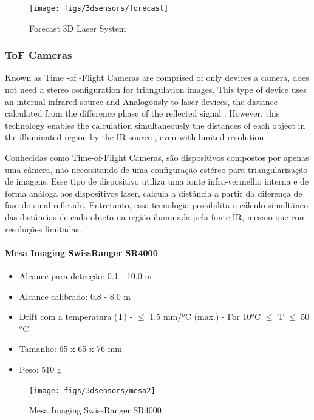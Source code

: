 \begin{figure}[h!]
   \centering
   \texttt{[image: figs/3dsensors/forecast]}
   \caption{Forecast 3D Laser System}
   \label{fig::forecast}
\end{figure}

\subsubsection{ToF Cameras}

Known as Time -of -Flight Cameras are comprised of only devices
a camera, does not need a stereo configuration for triangulation
images. This type of device uses an internal infrared source and
Analogously to laser devices, the distance calculated from the difference
phase of the reflected signal . However, this technology enables the calculation
simultaneously the distances of each object in the illuminated region by the IR source ,
even with limited resolution 

Conhecidas como Time-of-Flight Cameras, são dispositivos compostos por apenas
uma câmera, não necessitando de uma configuração estéreo para triangularização
de imagens. Esse tipo de dispositivo utiliza uma fonte infra-vermelho interna e de
forma análoga aos dispositivos laser, calcula a distância a partir da diferença
de fase do sinal refletido. Entretanto, essa tecnologia possibilita o cálculo
simultâneo das distâncias de cada objeto na região iluminada pela fonte IR,
mesmo que com resoluções limitadas.

\paragraph{Mesa Imaging SwissRanger SR4000}


\begin{itemize}
  \item Alcance para detecção: 0.1 - 10.0 m
  \item Alcance calibrado: 0.8 - 8.0 m
  \item Drift com a temperatura (T) - $\leq$ 1.5 mm/$^o$C (max.) - For 10$^o$C
  $\leq$ T $\leq$ 50$^o$C
  \item Tamanho: 65 x 65 x 76 mm
  \item Peso: 510 g
\end{itemize}

\begin{figure}[h!]
   \centering
   \texttt{[image: figs/3dsensors/mesa2]}
   \caption{Mesa Imaging SwissRanger SR4000}
   \label{fig::mesa}
\end{figure}

